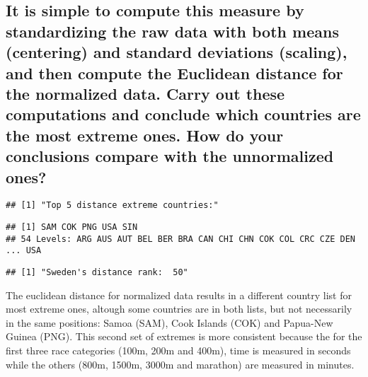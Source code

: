 \documentclass[]{article}
\begin{document}
\hypertarget{it-is-simple-to-compute-this-measure-by-standardizing-the-raw-data-with-both-means-centering-and-standard-deviations-scaling-and-then-compute-the-euclidean-distance-for-the-normalized-data.-carry-out-these-computations-and-conclude-which-countries-are-the-most-extreme-ones.-how-do-your-conclusions-compare-with-the-unnormalized-ones}{%
\subsection{It is simple to compute this measure by standardizing the
raw data with both means (centering) and standard deviations (scaling),
and then compute the Euclidean distance for the normalized data. Carry
out these computations and conclude which countries are the most extreme
ones. How do your conclusions compare with the unnormalized
ones?}\label{it-is-simple-to-compute-this-measure-by-standardizing-the-raw-data-with-both-means-centering-and-standard-deviations-scaling-and-then-compute-the-euclidean-distance-for-the-normalized-data.-carry-out-these-computations-and-conclude-which-countries-are-the-most-extreme-ones.-how-do-your-conclusions-compare-with-the-unnormalized-ones}}

\begin{verbatim}
## [1] "Top 5 distance extreme countries:"
\end{verbatim}

\begin{verbatim}
## [1] SAM COK PNG USA SIN
## 54 Levels: ARG AUS AUT BEL BER BRA CAN CHI CHN COK COL CRC CZE DEN ... USA
\end{verbatim}

\begin{verbatim}
## [1] "Sweden's distance rank:  50"
\end{verbatim}

The euclidean distance for normalized data results in a different
country list for most extreme ones, altough some countries are in both
lists, but not necessarily in the same positions: Samoa (SAM), Cook
Islands (COK) and Papua-New Guinea (PNG). This second set of extremes is
more consistent because the for the first three race categories (100m,
200m and 400m), time is measured in seconds while the others (800m,
1500m, 3000m and marathon) are measured in minutes.
\end{document}
